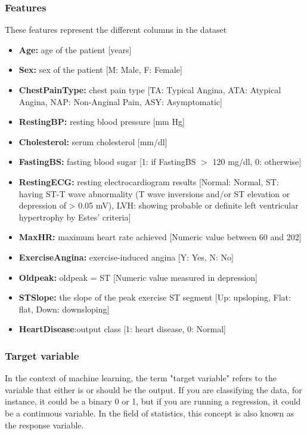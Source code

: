 \subsubsection{Features}
These features represent the different columns in the dataset
\begin{itemize}
	\item{\textbf{Age:} age of the patient [years]}
	\item{\textbf{Sex:} sex of the patient [M: Male, F: Female]}
	\item{\textbf{ChestPainType:} chest pain type [TA: Typical Angina, ATA: Atypical Angina, NAP: Non-Anginal Pain, ASY: Asymptomatic]}
	\item{\textbf{RestingBP:} resting blood pressure [mm Hg]}
	\item{\textbf{Cholesterol:} serum cholesterol [mm/dl]}
	\item{\textbf{FastingBS:} fasting blood sugar [1: if FastingBS $>$ 120 mg/dl, 0: otherwise]}
	\item{\textbf{RestingECG:} resting electrocardiogram results [Normal: Normal, ST: having ST-T wave abnormality (T wave inversions and/or ST elevation or depression of > 0.05 mV), LVH: showing probable or definite left ventricular hypertrophy by Estes' criteria]}
	\item{\textbf{MaxHR:} maximum heart rate achieved [Numeric value between 60 and 202]}
	\item{\textbf{ExerciseAngina:} exercise-induced angina [Y: Yes, N: No]}
	\item{\textbf{Oldpeak:} oldpeak = ST [Numeric value measured in depression]}
	\item{\textbf{ST\textunderscore Slope:} the slope of the peak exercise ST segment [Up: upsloping, Flat: flat, Down: downsloping]}
	\item{\textbf{HeartDisease}:output class [1: heart disease, 0: Normal]}
\end{itemize}

\subsubsection{Target variable}
In the context of machine learning, the term "target variable" refers to the variable that either is or should be the output. If you are classifying the data, for instance, it could be a binary 0 or 1, but if you are running a regression, it could be a continuous variable. In the field of statistics, this concept is also known as the response variable.

